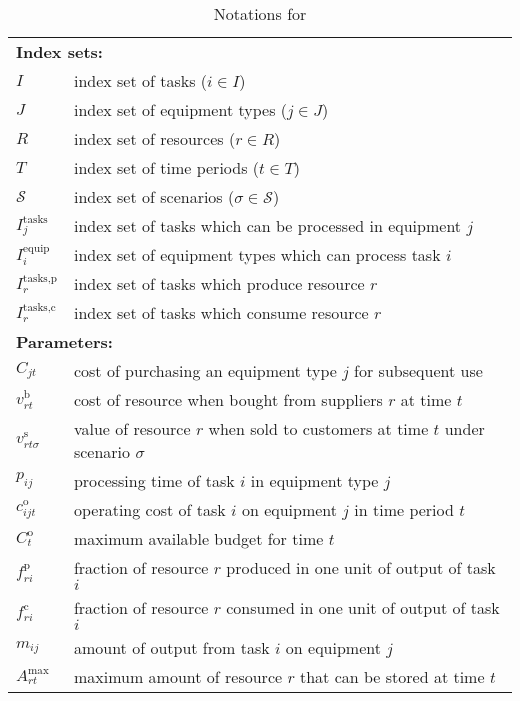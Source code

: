 \begin{table}[H]
	\caption{Notations for \chem}
	\label{chem:notation}
	\resizebox{\textwidth}{!}
	{
		\begin{tabular}{ll}
			\toprule
			\multicolumn{2}{l}{\textbf{Index sets:}} \\
			$I$ & index set of tasks ($i\in I$)\\ 
			$J$ & index set of equipment types ($j\in J$)\\ 
			$R$ & index set of resources ($r\in R$)\\ 
			$T$ & index set of time periods ($t\in T$)\\ 
			$\mathcal{S}$ & index set of scenarios ($\sigma\in \mathcal{S}$)\\
			$I_j^{\textrm{tasks}}$ & index set of tasks which can be processed in equipment $j$\\ 
			$I_i^{\textrm{equip}}$ & index set of equipment types which can process task $i$\\ 			
			$I_{r}^{\textrm{tasks,p}}$ & index set of tasks which produce resource $r$\\ 
			$I_{r}^{\textrm{tasks,c}}$ & index set of tasks which consume resource $r$\\
			\midrule
			\multicolumn{2}{l}{\textbf{Parameters:}} \\
			$C_{jt}$ & cost of purchasing an equipment type $j$ for subsequent use \\
			$v_{rt}^\textrm{b}$ & cost of resource when bought from suppliers $r$ at time $t$\\
			$v_{rt\sigma}^\textrm{s}$ & value of resource $r$ when sold to customers at time $t$ under scenario $\sigma$ \\		
			$p_{ij}$ & processing time of task $i$ in equipment type $j$\\
			$c_{ijt}^\textrm{o}$ & operating cost of task $i$ on equipment $j$ in time period $t$  \\
			$C_t^\textrm{o}$ & maximum available budget for time $t$\\
			$f_{ri}^{\textrm{p}}$ & fraction of resource $r$ produced in one unit of output of task $i$\\
			$f_{ri}^{\textrm{c}}$ & fraction of resource $r$ consumed in one unit of output of task $i$\\
			$m_{ij}$& amount of output from task $i$ on equipment $j$\\			
			$A_{rt}^{\textrm{max}}$& maximum amount of resource $r$ that can be stored at time $t$\\

\end{tabular}}
\end{table}
